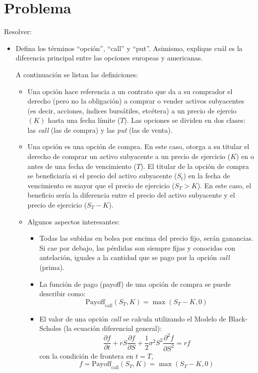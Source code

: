 




\section{Problema}
\begin{problema}[Problema D]
    Resolver:  
    \begin{itemize}
        \item  Defina los términos “opción”, “call” y “put”. Asimismo, explique cuál es la diferencia principal entre las opciones europeas y americanas.
        \begin{sol}
            A continuación se listan las definiciones: 
            \begin{itemize}
                \item  Una opción hace referencia a un contrato que da a su comprador el derecho (pero no la obligación) a comprar o vender activos subyacentes (es decir, acciones, índices bursátiles, etcétera) a un precio de ejercio $(K)$ hasta una fecha límite ($T$). Las opciones se dividen en dos clases: las \textit{call} (las de compra) y las \textit{put} (las de venta).
                \item Una opción  es una opción de compra. En este caso, otorga a su titular el derecho de comprar un activo subyacente a un precio de ejercicio ($K$) en o antes de una fecha de vencimiento ($T$). El titular de la opción de compra se beneficiaría si el precio del activo subyacente ($S_t$) en la fecha de vencimiento es mayor que el precio de ejercicio ($S_T > K$). En este caso, el beneficio sería la diferencia entre el precio del activo subyacente y el precio de ejercicio ($S_T - K$).
                \item 
                Algunos aspectos interesantes: 
                \begin{itemize}
                    \item Todas las subidas en bolsa por encima del precio fijo, serán ganancias. Si cae por debajo, las pérdidas son siempre fijas y conocidas con antelación, iguales a la cantidad que se pago por la opción \textit{call} (prima).
                    \item La función de pago (payoff) de una opción de compra se puede describir como:
                        $$\text{Payoff}_\text{call}(S_T, K )=\max(S_ 
                        T-K,0)$$
                    \item El valor de una opción \textit{call} se calcula utilizando el Modelo de Black-Scholes (la ecuación diferencial general): 
                    $$\frac{\partial f}{\partial t}+rS \frac{\partial f}{\partial S}+\frac{1}{2}\sigma^2 S^2 \frac{\partial ^2 f}{\partial S^2}=rf$$
                    con la condición de frontera en $t=T$, 
                    $$f=\text{Payoff}_\text{call}(S_T, K )=\max(S_T-K,0)$$
                    

\end{itemize}
\end{itemize}
\end{sol}
\end{itemize}
\end{problema}
